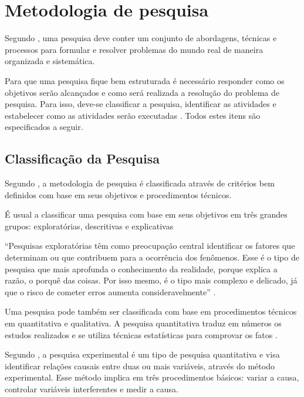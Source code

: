 \chapter{Metodologia de pesquisa}

Segundo , uma pesquisa deve conter um conjunto de abordagens, técnicas e processos para formular e resolver problemas do mundo real de maneira organizada e sistemática.

Para que uma pesquisa fique bem estruturada é necessário responder como os objetivos serão alcançados e  como será realizada a resolução do problema de pesquisa. Para isso, deve-se classificar a pesquisa, identificar as atividades e estabelecer como as atividades serão executadas \cite{forcon2014}. Todos estes itens são especificados a seguir.

\section{Classificação da Pesquisa}

Segundo , a metodologia de pesquisa é classificada através de critérios bem definidos com base em seus objetivos e procedimentos técnicos.

 É usual a classificar uma pesquisa com base em seus objetivos em três grandes grupos: exploratórias, descritivas e explicativas \cite[pág.~41]{gil2008}

\begin{citacao}
“Pesquisas exploratórias têm como preocupação central identificar os fatores que determinam ou que contribuem para a ocorrência dos fenômenos. Esse é o tipo de pesquisa que mais aprofunda o conhecimento da realidade, porque explica a razão, o porquê das coisas. Por isso mesmo, é o tipo mais complexo e delicado, já que o risco de cometer erros aumenta consideravelmente” \cite[pág.~43]{gil2008}.
\end{citacao}

Uma pesquisa pode também ser classificada com base em procedimentos técnicos em quantitativa e qualitativa. A pesquisa quantitativa traduz em números os estudos realizados e se utiliza técnicas estatísticas para comprovar os fatos \cite[pág.~9]{rodrigues2007}.

Segundo \cite[pág.~2]{bandeira2012}, a pesquisa experimental é um tipo de pesquisa quantitativa e visa identificar relações causais entre duas ou mais variáveis, através do método experimental. Esse método implica em três procedimentos básicos: variar a causa, controlar variáveis interferentes e medir a causa.

